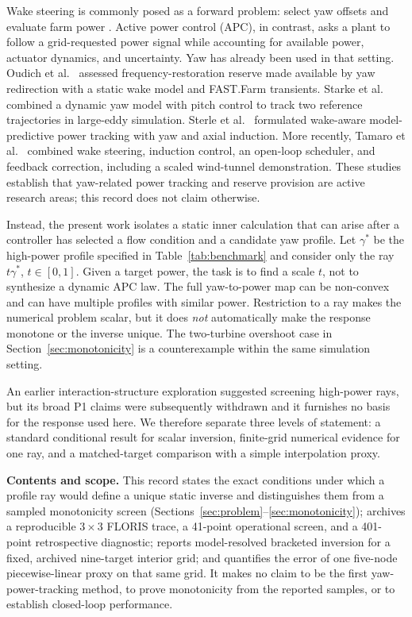 \documentclass[wes, manuscript]{copernicus}
\begin{document}
Wake steering is commonly posed as a forward problem: select yaw offsets and evaluate farm power \citep{gebraad2016wind,fleming2017field}. Active power control (APC), in contrast, asks a plant to follow a grid-requested power signal while accounting for available power, actuator dynamics, and uncertainty. Yaw has already been used in that setting. Oudich et al.\ \citep{oudich2023reserve} assessed frequency-restoration reserve made available by yaw redirection with a static wake model and FAST.Farm transients. Starke et al.\ \citep{starke2023yawtracking} combined a dynamic yaw model with pitch control to track two reference trajectories in large-eddy simulation. Sterle et al.\ \citep{sterle2024mpc} formulated wake-aware model-predictive power tracking with yaw and axial induction. More recently, Tamaro et al.\ \citep{tamaro2025robust,tamaro2026scaled} combined wake steering, induction control, an open-loop scheduler, and feedback correction, including a scaled wind-tunnel demonstration. These studies establish that yaw-related power tracking and reserve provision are active research areas; this record does not claim otherwise.

Instead, the present work isolates a static inner calculation that can arise after a controller has selected a flow condition and a candidate yaw profile. Let $\gamma^\ast$ be the high-power profile specified in Table~\ref{tab:benchmark} and consider only the ray $t\gamma^\ast$, $t\in[0,1]$. Given a target power, the task is to find a scale $t$, not to synthesize a dynamic APC law. The full yaw-to-power map can be non-convex and can have multiple profiles with similar power. Restriction to a ray makes the numerical problem scalar, but it does \emph{not} automatically make the response monotone or the inverse unique. The two-turbine overshoot case in Section~\ref{sec:monotonicity} is a counterexample within the same simulation setting.

An earlier interaction-structure exploration suggested screening high-power rays, but its broad P1 claims were subsequently withdrawn and it furnishes no basis for the response used here. We therefore separate three levels of statement: a standard conditional result for scalar inversion, finite-grid numerical evidence for one ray, and a matched-target comparison with a simple interpolation proxy.

\textbf{Contents and scope.} This record states the exact conditions under which a profile ray would define a unique static inverse and distinguishes them from a sampled monotonicity screen (Sections~\ref{sec:problem}--\ref{sec:monotonicity}); archives a reproducible $3\times3$ FLORIS trace, a 41-point operational screen, and a 401-point retrospective diagnostic; reports model-resolved bracketed inversion for a fixed, archived nine-target interior grid; and quantifies the error of one five-node piecewise-linear proxy on that same grid. It makes no claim to be the first yaw-power-tracking method, to prove monotonicity from the reported samples, or to establish closed-loop performance.
\end{document}
